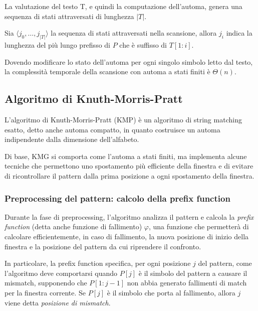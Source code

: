 La valutazione del testo T, e quindi la computazione dell'automa, genera una sequenza di stati attraversati di lunghezza $|T|$.

\begin{thm}
    Sia $\langle j_0, \ldots, j_{|T|} \rangle$ la sequenza di stati attraversati nella scansione, allora $j_i$ indica la lunghezza del più lungo prefisso di $P$ che è suffisso di $T[1:i]$.
\end{thm}
Dovendo modificare lo stato dell'automa per ogni singolo simbolo letto dal testo, la complessità temporale della scansione con automa a stati finiti è $\Theta(n)$.



\subsection*{Algoritmo di Knuth-Morris-Pratt}
L'algoritmo di Knuth-Morris-Pratt (KMP) è un algoritmo di string matching esatto, detto anche automa compatto, in quanto costruisce un automa indipendente dalla dimensione dell'alfabeto.

Di base, KMG si comporta come l'automa a stati finiti, ma implementa alcune tecniche che permettono uno spostamento più efficiente della finestra e di evitare di ricontrollare il pattern dalla prima posizione a ogni spostamento della finestra.

\subsubsection{Preprocessing del pattern: calcolo della prefix function}
Durante la fase di preprocessing, l'algoritmo analizza il pattern e calcola la \textit{prefix function} (detta anche funzione di fallimento) $\varphi$, una funzione che permetterà di calcolare efficientemente, in caso di fallimento, la nuova posizione di inizio della finestra e la posizione del pattern da cui riprendere il confronto.

In particolare, la prefix function specifica, per ogni posizione $j$ del pattern, come l'algoritmo deve comportarsi quando $P[j]$ è il simbolo del pattern a causare il mismatch, supponendo che $P[1:j-1]$ non abbia generato fallimenti di match per la finestra corrente.
Se $P[j]$ è il simbolo che porta al fallimento, allora $j$ viene detta \textit{posizione di mismatch}.

